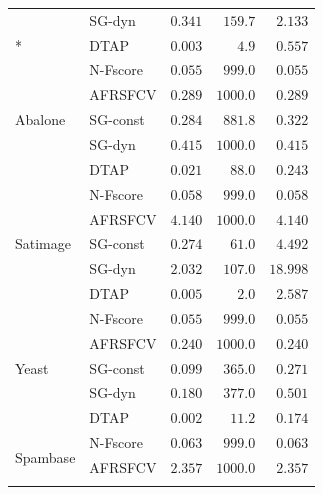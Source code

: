 \documentclass[]{interact}
\theoremstyle{plain}
\theoremstyle{definition}
\theoremstyle{remark}
\begin{document}
{\begin{longtable}{ll rrr}
                              & SG-dyn   & $0.341$          & $159.7$         & $2.133$          \\*
                              & DTAP     & $\mathbf{0.003}$ & $\mathbf{4.9}$  & $0.557$          \\
\midrule
\multirow{5}{*}{Abalone}      & N-Fscore & $0.055$          & $999.0$         & $\mathbf{0.055}$ \\*
                              & AFRSFCV  & $0.289$          & $1000.0$        & $0.289$          \\*
                              & SG-const & $0.284$          & $881.8$         & $0.322$          \\*
                              & SG-dyn   & $0.415$          & $1000.0$        & $0.415$          \\*
                              & DTAP     & $\mathbf{0.021}$ & $\mathbf{88.0}$ & $0.243$          \\
\midrule
\multirow{5}{*}{Satimage}     & N-Fscore & $0.058$          & $999.0$         & $\mathbf{0.058}$ \\*
                              & AFRSFCV  & $4.140$          & $1000.0$        & $4.140$          \\*
                              & SG-const & $0.274$          & $61.0$          & $4.492$          \\*
                              & SG-dyn   & $2.032$          & $107.0$         & $18.998$         \\*
                              & DTAP     & $\mathbf{0.005}$ & $\mathbf{2.0}$  & $2.587$          \\
\midrule
\multirow{5}{*}{Yeast}        & N-Fscore & $0.055$          & $999.0$         & $\mathbf{0.055}$ \\*
                              & AFRSFCV  & $0.240$          & $1000.0$        & $0.240$          \\*
                              & SG-const & $0.099$          & $365.0$         & $0.271$          \\*
                              & SG-dyn   & $0.180$          & $377.0$         & $0.501$          \\*
                              & DTAP     & $\mathbf{0.002}$ & $\mathbf{11.2}$ & $0.174$          \\
\midrule
\multirow{5}{*}{Spambase}     & N-Fscore & $0.063$          & $999.0$         & $\mathbf{0.063}$ \\*
                              & AFRSFCV  & $2.357$          & $1000.0$        & $2.357$          \\*

\end{longtable}}
\end{document}
